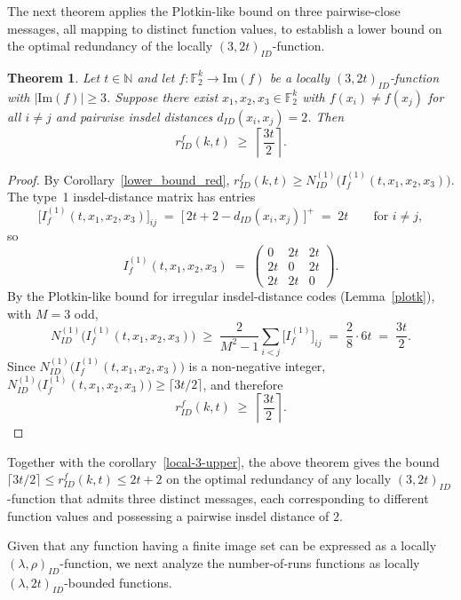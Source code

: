 \documentclass[11 pt]{article}
\numberwithin{equation}{section}
\newtheorem{theorem}{Theorem}[section]
\begin{document}
    The next theorem applies the Plotkin-like bound on three pairwise-close messages, all mapping to distinct function values, to establish a lower bound on the optimal redundancy of the locally $(3, 2t)_{ID}$-function.
    
    \begin{theorem}
    \label{thm:local-3-lower}
    Let $t \in \mathbb{N}$ and let $f : \mathbb{F}_2^k \to \mathrm{Im}(f)$ be a locally $(3, 2t)_{ID}$-function with $|\mathrm{Im}(f)| \geq 3$. Suppose there exist $x_1, x_2, x_3 \in \mathbb{F}_2^k$ with $f(x_i) \neq f(x_j)$ for all $i \neq j$ and pairwise insdel distances $d_{ID}(x_i, x_j) = 2$. Then
    \[
    r^{f}_{ID}(k, t) \;\geq\; \left\lceil \frac{3t}{2} \right\rceil.
    \]
    \end{theorem}

    \begin{proof}
    By Corollary~\ref{lower_bound_red}, $r^{f}_{ID}(k, t) \geq N^{(1)}_{ID}\!\big(I^{(1)}_{f}(t, x_1, x_2, x_3)\big)$. 
    The type~1 insdel-distance matrix has entries
    \[
    \big[I^{(1)}_{f}(t, x_1, x_2, x_3)\big]_{ij} 
    \;=\; \big[\,2t + 2 - d_{ID}(x_i, x_j)\,\big]^{+} 
    \;=\; 2t \qquad \text{for } i \neq j,
    \]
    so
    \[
    I^{(1)}_{f}(t, x_1, x_2, x_3) 
    \;=\; \begin{pmatrix} 0 & 2t & 2t \\ 2t & 0 & 2t \\ 2t & 2t & 0 \end{pmatrix}.
    \]
    By the Plotkin-like bound for irregular insdel-distance codes (Lemma~\ref{plotk}), with $M = 3$ odd,
    \[
    N^{(1)}_{ID}\!\big(I^{(1)}_{f}(t, x_1, x_2, x_3)\big) 
    \;\geq\; \frac{2}{M^2 - 1} \sum_{i < j} \big[I^{(1)}_{f}\big]_{ij} 
    \;=\; \frac{2}{8} \cdot 6t 
    \;=\; \frac{3t}{2}.
    \]
    Since $N^{(1)}_{ID}\!\big(I^{(1)}_{f}(t, x_1, x_2, x_3)\big)$ is a non-negative integer, $N^{(1)}_{ID}\!\big(I^{(1)}_{f}(t, x_1, x_2, x_3)\big)  \geq \lceil 3t / 2 \rceil$, and therefore
    \[
    r^{f}_{ID}(k, t) \;\geq\; \left\lceil \frac{3t}{2} \right\rceil. 
    \]
    \end{proof}

    Together with the corollary~\ref{local-3-upper}, the above theorem gives the bound $\lceil 3t/2\rceil \le r^{f}_{ID}(k,t)\le 2t+2$ on the optimal redundancy of any locally $(3,2t)_{ID}$-function that admits three distinct messages, each corresponding to different function values and possessing a pairwise insdel distance of $2$.
    
    Given that any function having a finite image set can be expressed as a locally $(\lambda, \rho)_{ID}$-function, we next analyze the number-of-runs functions 
    as locally $(\lambda, 2t )_{ID}$-bounded functions.
    
\end{document}
